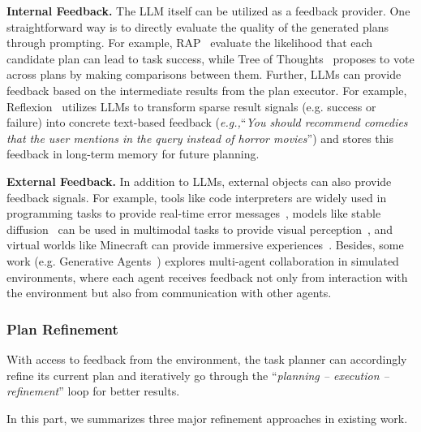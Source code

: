{{{{{\textbf{Internal Feedback.} The LLM itself can be utilized as a feedback provider. One straightforward way is to directly evaluate the quality of the generated plans through prompting. For example, RAP~\cite{Hao-2023-arXiv-reasoning} evaluate the likelihood that each candidate plan can lead to task success, while Tree of Thoughts~\cite{Yao-2023-arXiv-tree} proposes to vote across plans by making comparisons between them. Further, LLMs can provide feedback based on the intermediate results from the plan executor. For example, Reflexion~\cite{Shinn-2023-arXiv-Reflexion} utilizes LLMs to transform sparse result signals (e.g. success or failure) into concrete {text-based feedback (\emph{e.g.,}``\emph{You should recommend comedies that the user mentions in the query instead of horror movies}'') and stores this feedback in long-term memory for future planning.}

\textbf{External Feedback.} In addition to LLMs, external objects can also provide feedback signals. For example, tools like code interpreters are widely used in programming tasks to provide real-time error messages~\cite{Shinn-2023-arXiv-Reflexion}, models like stable diffusion~\cite{Rombach-2022-CVPR-high} can be used in multimodal tasks to provide visual perception~\cite{Lu-2023-arXiv-multimodal}, and {virtual worlds} like Minecraft can provide immersive experiences~\cite{Wang-2023-arXiv-voyager}. Besides, some work (e.g. Generative Agents~\cite{Park-arxiv-2023-Generative}) explores multi-agent collaboration in simulated environments, where each agent receives feedback not only from interaction with the environment but also from communication with other agents.

\subsubsection{Plan Refinement}
\label{sec:plan-refine}

With access to feedback from the environment, the task planner can accordingly refine its current plan and iteratively go through the ``\emph{planning -- execution -- refinement}'' loop for better results.

In this part, we summarizes three major refinement approaches in existing work. 

}}}}}
